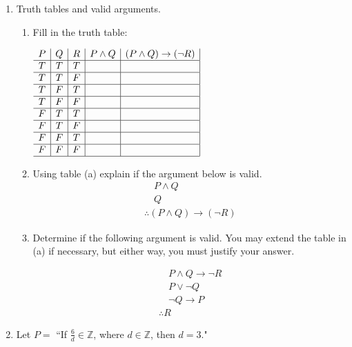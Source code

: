 \documentclass[11pt,letterpaper]{article}
\begin{document}
\begin{enumerate}
\newpage

\item Truth tables and valid arguments.

\begin{enumerate}

\vspace{1pc}
\item Fill in the truth table:

\vspace{1pc}
$\begin{array}{c | c | c| c | c|}
P & Q & R & P\wedge Q & (P\wedge Q)\to (\neg R) \\
\hline
T & T & T & & \\
\hline
T & T & F & & \\
\hline
T & F & T & & \\
\hline
T & F & F & & \\
\hline
F & T & T & & \\
\hline
F & T & F & & \\
\hline
F & F & T & & \\
\hline
F & F & F & & \\
\hline
\end{array}$

\vspace{2pc}
\item Using table (a) explain if the argument below is valid. 
\[\begin{array}{l}
\quad P\wedge Q \\
\quad Q \\
\hline
\therefore (P\wedge Q)\to (\neg R)
\end{array}\]

\vspace{5pc}
\item Determine if the following argument is valid. You may extend the table in (a) if necessary, but either way, you must justify your answer.

\[\begin{array}{l}
\quad P\wedge Q\to\neg R \\
\quad P\vee\neg Q \\
\quad \neg Q\to P \\
\hline
\therefore R
\end{array}\]
\end{enumerate}

\newpage
\item Let $P=$  ``If $\frac{6}{d}\in\mathbb Z$, where $d\in\mathbb Z$, then $d=3$."
\begin{enumerate}


\end{enumerate}
\end{enumerate}
\end{document}
